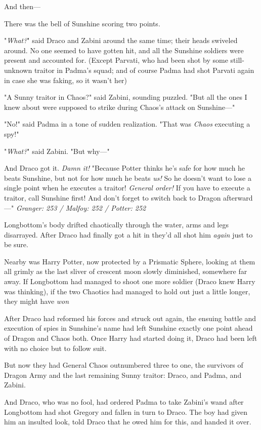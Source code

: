 And then---

There was the bell of Sunshine scoring two points.

"\emph{What?}" said Draco and Zabini around the same time; their heads swiveled
around. No one seemed to have gotten hit, and all the Sunshine soldiers were
present and accounted for. (Except Parvati, who had been shot by some
still-unknown traitor in Padma's squad; and of course Padma had shot Parvati
again in case she was faking, so it wasn't her{\el})

"A Sunny traitor in Chaos?" said Zabini, sounding puzzled. "But all the ones I
knew about were supposed to strike during Chaos's attack on Sunshine\mbox{---}"

"No!" said Padma in a tone of sudden realization. "That was \emph{Chaos}
executing a spy!"

"\emph{What?}" said Zabini. "But why\mbox{---}"

And Draco got it. \emph{Damn it!} "Because Potter thinks he's safe for how much
he beats Sunshine, but not for how much he beats \emph{us!} So he doesn't want
to lose a single point when he executes a traitor! \emph{General order!} If you
have to execute a traitor, call Sunshine first! And don't forget to switch back
to Dragon afterward\mbox{---}"
\sbreak
\emph{Granger: 253 / Malfoy: 252 / Potter: 252}

Longbottom's body drifted chaotically through the water, arms and legs
disarrayed. After Draco had finally got a hit in they'd all shot him
\emph{again} just to be sure.

Nearby was Harry Potter, now protected by a Prismatic Sphere, looking at them
all grimly as the last sliver of crescent moon slowly diminished, somewhere far
away. If Longbottom had managed to shoot one more soldier (Draco knew Harry was
thinking), if the two Chaotics had managed to hold out just a little longer,
they might have \emph{won}{\el}

After Draco had reformed his forces and struck out again, the ensuing battle
and execution of spies in Sunshine's name had left Sunshine exactly one point
ahead of Dragon and Chaos both. Once Harry had started doing it, Draco had been
left with no choice but to follow suit.

But now they had General Chaos outnumbered three to one, the survivors of
Dragon Army and the last remaining Sunny traitor: Draco, and Padma, and Zabini.

And Draco, who was no fool, had ordered Padma to take Zabini's wand after
Longbottom had shot Gregory and fallen in turn to Draco. The boy had given him
an insulted look, told Draco that he owed him for this, and handed it over.


